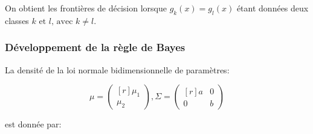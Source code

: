 \documentclass{article}
\begin{document}
\begin{multicols}{2}
On obtient les frontières de décision lorsque $g_k(x) = g_l(x)$ étant données
deux classes $k \text{ et } l \text{, avec } k \neq l$.

\subsubsection{Développement de la règle de Bayes}\label{subsubsec:ex213}

La densité de la loi normale bidimensionnelle de paramètres:

\begin{equation}
    \mu = \begin{pmatrix*}[r]
        \mu_1 \\
        \mu_2
    \end{pmatrix*},
    \Sigma = \begin{pmatrix*}[r]
        a & 0 \\
        0 & b
    \end{pmatrix*}
\end{equation}

est donnée par:


\end{multicols}
\end{document}
